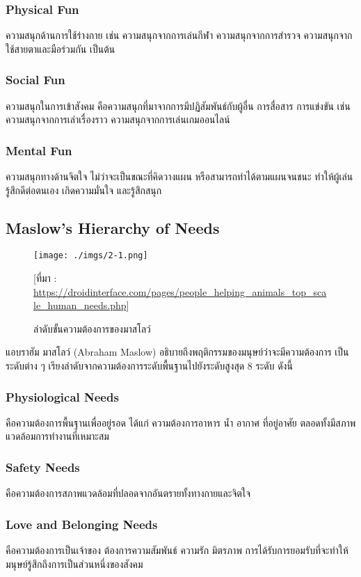 \documentclass[12pt,oneside,openright,a4paper]{cpe-thai-project}
\begin{document}
\subsubsection{Physical Fun}
ความสนุกด้านการใช้ร่างกาย เช่น ความสนุกจากการเล่นกีฬา 
ความสนุกจากการสำรวจ ความสนุกจากใช้สายตาและมือร่วมกัน เป็นต้น
\subsubsection{Social Fun}
ความสนุกในการเข้าสังคม คือความสนุกที่มาจากการมีปฏิสัมพันธ์กับผู้อื่น 
การสื่อสาร การแข่งขัน เช่น ความสนุกจากการเล่าเรื่องราว 
ความสนุกจากการเล่นเกมออนไลน์
\subsubsection{Mental Fun}
ความสนุกทางด้านจิตใจ ไม่ว่าจะเป็นขณะที่คิดวางแผน 
หรือสามารถทำได้ตามแผนจนชนะ ทำให้ผู้เล่นรู้สึกดีต่อตนเอง 
เกิดความมั่นใจ และรู้สึกสนุก

\pagebreak
\subsection{Maslow’s Hierarchy of Needs}

\begin{figure}[!h]\centering
\texttt{[image: ./imgs/2-1.png]}
\caption{ลำดับขั้นความต้องการของมาสโลว์}\label{fig:2-1}
\small [ที่มา : \url{https://droidinterface.com/pages/people_helping_animals_top_scale_human_needs.php}]
\end{figure}

แอบราฮัม มาสโลว์ (Abraham Maslow) อธิบายถึงพฤติกรรมของมนุษย์ว่าจะมีความต้องการ
เป็นระดับต่าง ๆ เรียงลำดับจากความต้องการระดับพื้นฐานไปยังระดับสูงสุด 8 ระดับ ดังนี้

\subsubsection{Physiological Needs}
  คือความต้องการพื้นฐานเพื่ออยู่รอด ได้แก่ ความต้องการอาหาร น้ำ อากาศ 
ที่อยู่อาศัย ตลอดทั้งมีสภาพแวดล้อมการทำงานที่เหมาะสม
\subsubsection{Safety Needs}
  คือความต้องการสภาพแวดล้อมที่ปลอดจากอันตรายทั้งทางกายและจิตใจ 
\subsubsection{Love and Belonging Needs}
  คือความต้องการเป็นเจ้าของ ต้องการความสัมพันธ์ ความรัก มิตรภาพ 
  การได้รับการยอมรับที่จะทำให้มนุษย์รู้สึกถึงการเป็นส่วนหนึ่งของสังคม
\end{document}
